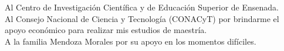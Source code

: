 
\hspace{12pt}
\bigskip
Al Centro de Investigación Científica y de Educación Superior de Ensenada.\\
Al Consejo Nacional de Ciencia y Tecnología (CONACyT) por brindarme el apoyo econ\'omico para realizar mis estudios de maestría.\\
A la familia Mendoza Morales por su apoyo en los momentos dif\'iciles.\\
